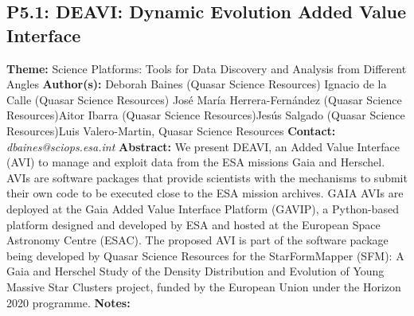 \documentclass{report}
\begin{document}
{{{{{{{{{{{{{\subsection*{P5.1: DEAVI: Dynamic Evolution Added Value Interface}
{\bf Theme:}  Science Platforms: Tools for Data Discovery and Analysis from Different Angles\newline
{\bf Author(s):}\newline
Deborah Baines (Quasar Science Resources) \newline Ignacio de la Calle (Quasar Science Resources) \newline  José María Herrera-Fernández (Quasar Science Resources)\newline  Aitor Ibarra (Quasar Science Resources)\newline Jesús Salgado (Quasar Science Resources)\newline  Luis Valero-Martin, Quasar Science Resources\newline\newline
{\bf Contact:} {\it dbaines@sciops.esa.int}\newline
\newline\newline
{\bf Abstract:}\newline
We present DEAVI, an Added Value Interface (AVI) to manage and exploit data from the ESA missions Gaia and Herschel. AVIs are software packages that provide scientists with the mechanisms to submit their own code to be executed close to the ESA mission archives. GAIA AVIs are deployed at the Gaia Added Value Interface Platform (GAVIP), a Python-based platform designed and developed by ESA and hosted at the European Space Astronomy Centre (ESAC). The proposed AVI is part of the software package being developed by Quasar Science Resources for the StarFormMapper (SFM): A Gaia and Herschel Study of the Density Distribution and Evolution of Young Massive Star Clusters project, funded by the European Union under the Horizon 2020 programme.\newline
{\bf Notes:}\newline
{\newpage
}}}}}}}}}}}}}}
\end{document}
